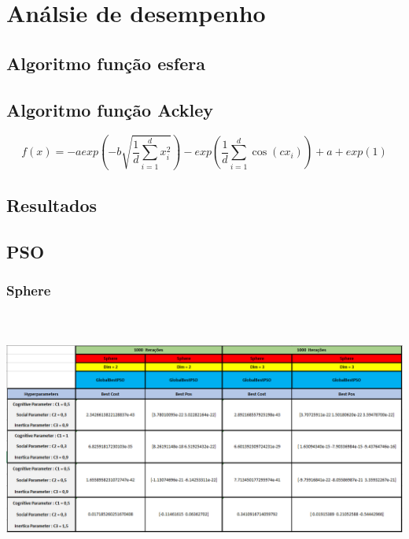 \documentclass[10pt]{article}
\begin{document}
\section{Análsie de desempenho}\label{sec:an-do-desem}

\subsection{Algoritmo função esfera }\label{sec:apre-da-org}
\subsection{Algoritmo função Ackley }\label{sec:alg-Ackley}
\begin{equation}
  f(x) = -aexp(-b\sqrt{\frac{1}{d}\sum_{i = 1}^{d}x^2_i}) - exp(\frac{1}{d}\sum_{i = 1}^{d}\cos(cx_i)) + a + exp(1)
\end{equation}

\subsection{Resultados}\label{sec:comp-PSO}
\subsection{PSO}\label{sec:comp-PSO}
\subsubsection{Sphere}\label{sec:comp-PSO:center}
    \includegraphics[height=8.5cm]{img/PSOsphere.png}
\end{document}
